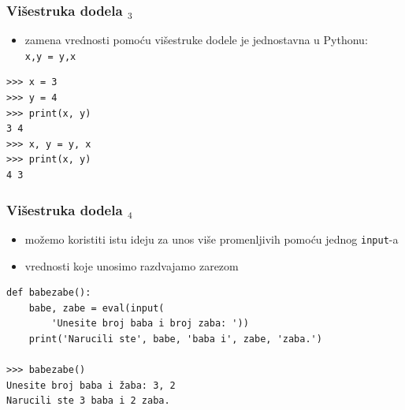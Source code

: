 \documentclass[utf8,compress]{beamer}
\begin{document}


\begin{frame}[fragile]
  \frametitle{Višestruka dodela $_3$}
  \begin{itemize}
    \item zamena vrednosti pomoću višestruke dodele je jednostavna u Pythonu: \\
      \texttt{x,y = y,x}
  \end{itemize}
\begin{verbatim}
>>> x = 3
>>> y = 4
>>> print(x, y)
3 4
>>> x, y = y, x
>>> print(x, y)
4 3
\end{verbatim}
\end{frame}

\begin{frame}[fragile]
  \frametitle{Višestruka dodela $_4$}
  \begin{itemize}
    \item možemo koristiti istu ideju za unos više promenljivih pomoću jednog \texttt{input}-a
    \item vrednosti koje unosimo razdvajamo zarezom
  \end{itemize}
\begin{verbatim}
def babezabe():
    babe, zabe = eval(input(
        'Unesite broj baba i broj zaba: '))
    print('Narucili ste', babe, 'baba i', zabe, 'zaba.')

>>> babezabe()
Unesite broj baba i žaba: 3, 2
Narucili ste 3 baba i 2 zaba.
\end{verbatim}
\end{frame}
\end{document}
